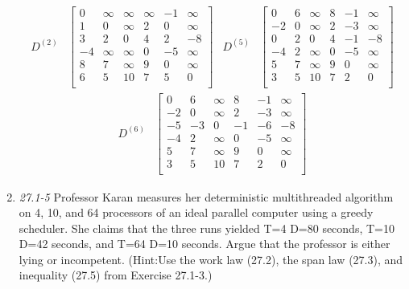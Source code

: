 \documentclass[]{memoir}
\begin{document}
\begin{enumerate}
\begin{align*}
D^{(2)} & \begin{bmatrix}
	0 & \infty & \infty & \infty & -1 & \infty \\
	1 & 0 & \infty & 2 & 0 & \infty \\
	3 & 2 & 0 & 4 & 2 & -8 \\
	-4 & \infty & \infty & 0 & -5 & \infty  \\
	8 & 7 & \infty & 9 & 0 & \infty \\
	6 & 5 & 10 & 7 & 5 & 0 \\ 
\end{bmatrix}
&
D^{(5)} & \begin{bmatrix}
	0 & 6 & \infty & 8 & -1 & \infty \\
	-2 & 0 & \infty & 2 & -3 & \infty \\
	0 & 2 & 0 & 4 & -1 & -8 \\
	-4 & 2 & \infty & 0 & -5 & \infty  \\
	5 & 7 & \infty & 9 & 0 & \infty \\
	3 & 5 & 10 & 7 & 2 & 0 \\ 
\end{bmatrix}
\end{align*}
\begin{align*}
D^{(6)} & \begin{bmatrix}
	0 & 6 & \infty & 8 & -1 & \infty \\
	-2 & 0 & \infty & 2 & -3 & \infty \\
	-5 & -3 & 0 & -1 & -6 & -8 \\
	-4 & 2 & \infty & 0 & -5 & \infty  \\
	5 & 7 & \infty & 9 & 0 & \infty \\
	3 & 5 & 10 & 7 & 2 & 0 \\ 
\end{bmatrix}
\end{align*}

\item \textit{27.1-5} Professor Karan measures her  deterministic multithreaded  algorithm  on 4, 10, and 64 processors  of  an  ideal  parallel  computer  using  a  greedy  scheduler.   She claims  that  the  three  runs  yielded T=4 D=80 seconds, T=10 D=42 seconds,  and T=64 D=10 seconds.  Argue that the professor is either lying or incompetent.  (Hint:Use the  work law (27.2),  the  span  law (27.3),  and  inequality  (27.5)  from  Exercise 27.1-3.)


\end{enumerate}
\end{document}
